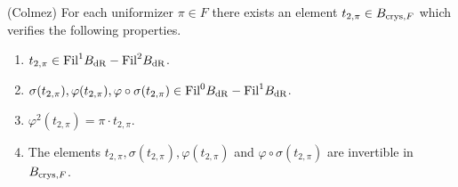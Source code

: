 \begin{prop}
\notready\label{idearef} (Colmez)
For each uniformizer $\pi \in F$ there exists an element $t_{2,\pi} \in B_{\textnormal{crys},F}$  which verifies the following properties.
\begin{enumerate}
\item $t_{2,\pi}  \in \textnormal{Fil} ^{1} B_{\mathrm{dR}}-\textnormal{Fil} ^{2} B_{\mathrm{dR}}$.
\item $\sigma (t_{2,\pi} ) , \varphi (t_{2,\pi} ) , \varphi \circ \sigma (t_{2,\pi} ) \in \textnormal{Fil} ^{0} B_{\mathrm{dR}}-\textnormal{Fil} ^{1} B_{\mathrm{dR}}$.
\item  $ \varphi^2(t_{2,\pi} ) = \pi \cdot t_{2,\pi} $.
\item The elements $t_{2,\pi}  ,  \sigma(t_{2,\pi} ), \varphi (t_{2,\pi} )$ and $ \varphi \circ \sigma (t_{2,\pi} )  $ are invertible in $B_{\textnormal{crys},F}$.
\end{enumerate}
\end{prop}
